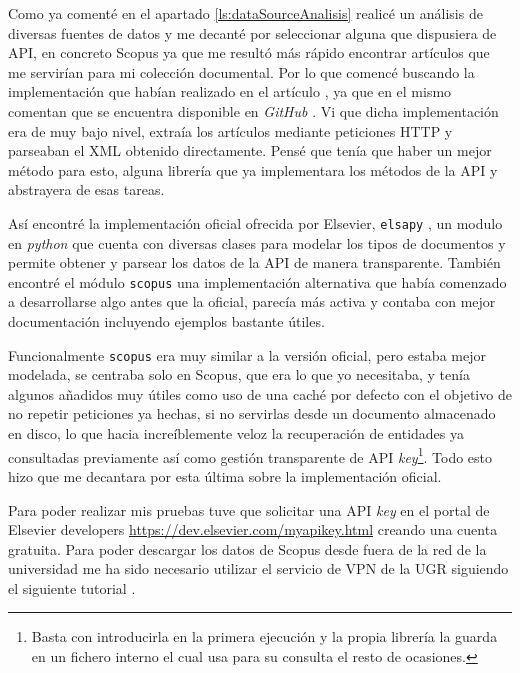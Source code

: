 Como ya comenté en el apartado \ref{ls:dataSourceAnalisis} realicé un análisis de diversas fuentes de datos y me decanté por seleccionar alguna que dispusiera de \acrshort{API}, en concreto Scopus ya que me resultó más rápido encontrar artículos que me servirían para mi colección documental. Por lo que comencé buscando la implementación que habían realizado en el artículo \cite{DBLP:conf/ecir/SarolLS18}, ya que en el mismo comentan que se encuentra disponible en \textit{GitHub} \cite{bir_scopus_gh}. Vi que dicha implementación era de muy bajo nivel, extraía los artículos mediante peticiones \acrshort{HTTP} y parseaban el \acrshort{XML} obtenido directamente. Pensé que tenía que haber un mejor método para esto, alguna librería que ya implementara los métodos de la \acrshort{API} y abstrayera de esas tareas. 

Así encontré la implementación oficial ofrecida por Elsevier, \texttt{elsapy} \cite{elsapy}, un modulo en \textit{python} que cuenta con diversas clases para modelar los tipos de documentos y permite obtener y parsear los datos de la \acrshort{API} de manera transparente. También encontré el módulo \texttt{scopus} \cite{scopus-api} una implementación alternativa que había comenzado a desarrollarse algo antes que la oficial, parecía más activa y contaba con mejor documentación incluyendo ejemplos bastante útiles. 

Funcionalmente \texttt{scopus} era muy similar a la versión oficial, pero estaba mejor modelada, se centraba solo en Scopus, que era lo que yo necesitaba, y tenía algunos añadidos muy útiles como uso de una caché por defecto con el objetivo de no repetir peticiones ya hechas, si no servirlas desde un documento almacenado en disco, lo que hacia increíblemente veloz la recuperación de entidades ya consultadas previamente así como gestión transparente de \acrshort{API} \textit{key}\footnote[3]{Basta con introducirla en la primera ejecución y la propia librería la guarda en un fichero interno el cual usa para su consulta el resto de ocasiones.}. Todo esto hizo que me decantara por esta última sobre la implementación oficial.

Para poder realizar mis pruebas tuve que solicitar una \acrshort{API} \textit{key} en el portal de Elsevier developers \url{https://dev.elsevier.com/myapikey.html} creando una cuenta gratuita. Para poder descargar los datos de Scopus desde fuera de la red de la universidad me ha sido necesario utilizar el servicio de \acrshort{VPN} de la \acrshort{UGR} siguiendo el siguiente tutorial \cite{vpnUGR}.


